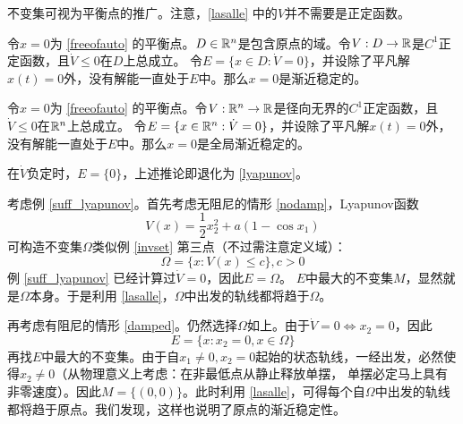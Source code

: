 \begin{note}
	不变集可视为平衡点的推广。注意，\ref{lasalle} 中的$V$并不需要是正定函数。
\end{note}
\begin{corollary}
	令$x=0$为 \eqref{freeofauto} 的平衡点。$D\in\mathbb{R}{}^n$是包含原点的域。令$V:D\to\mathbb{R}{}$是$C^1$正定函数，且$\dot{V}\le 0$在$D$上总成立。
	令$E=\{x\in D:\dot{V}=0\}$，并设除了平凡解$x(t)=0$外，没有解能一直处于$E$中。那么$x=0$是渐近稳定的。
\end{corollary}
\begin{corollary}\label{lasallegas}
	令$x=0$为 \eqref{freeofauto} 的平衡点。令$V:\mathbb{R}{}^n\to\mathbb{R}{}$是径向无界的$C^1$正定函数，且$\dot{V}\le 0$在$\mathbb{R}{}^n$上总成立。
	令$E=\{x\in \mathbb{R}{}^n:\dot{V}=0\}$，并设除了平凡解$x(t)=0$外，没有解能一直处于$E$中。那么$x=0$是全局渐近稳定的。
\end{corollary}
\begin{note}
	在$\dot{V}$负定时，$E=\{0\}$，上述推论即退化为 \ref{lyapunov}。
\end{note}
\begin{example}[利用LaSalle定理判别单摆系统稳定性]
	考虑例 \ref{suff_lyapunov}。首先考虑无阻尼的情形 \eqref{nodamp}，Lyapunov函数\[V(x)=\frac{1}{2}x_2^2+a(1-\cos x_1)\]
	可构造不变集$\Omega$类似例 \ref{invset} 第三点（不过需注意定义域）：\[\Omega=\{x:V(x)\le c\},c>0\]
	例 \ref{suff_lyapunov} 已经计算过$\dot{V}=0$，因此$E=\Omega$。
	$E$中最大的不变集$M$，显然就是$\Omega$本身。于是利用 \ref{lasalle}，$\Omega$中出发的轨线都将趋于$\Omega$。

	再考虑有阻尼的情形 \eqref{damped}。仍然选择$\Omega$如上。由于$\dot{V}=0\iff x_2=0$，因此\[E=\{x:x_2=0,x\in\Omega\}\]
	再找$E$中最大的不变集。由于自$x_1\ne 0,x_2=0$起始的状态轨线，一经出发，必然使得$x_2\ne 0$（从物理意义上考虑：在非最低点从静止释放单摆，
	单摆必定马上具有非零速度）。因此$M=\{(0,0)\}$。此时利用 \ref{lasalle}，可得每个自$\Omega$中出发的轨线都将趋于原点。我们发现，这样也说明了原点的渐近稳定性。
\end{example}
